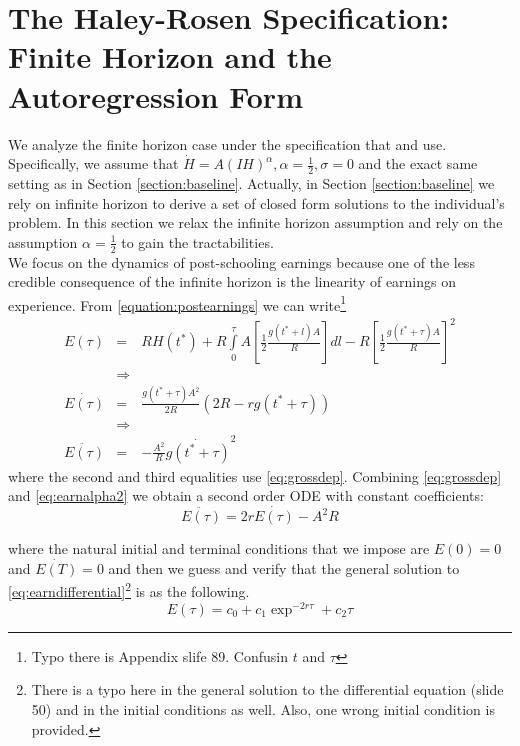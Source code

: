 \section{The Haley-Rosen Specification: Finite Horizon and the Autoregression Form}
We analyze the finite horizon case under the specification that \citet{haley1976estimation} and \citet{rosen1976theory} use. Specifically, we assume that $\dot{H} = A \left( IH \right)^{\alpha}, \alpha = \frac{1}{2}, \sigma = 0$ and the exact same setting as in Section \ref{section:baseline}. Actually, in Section \ref{section:baseline} we rely on infinite horizon to derive a set of closed form solutions to the individual's problem. In this section we relax the infinite horizon assumption and rely on the assumption $\alpha = \frac{1}{2}$ to gain the tractabilities.\\
\indent We focus on the dynamics of post-schooling earnings because one of the less credible consequence of the infinite horizon is the linearity of earnings on experience. From \eqref{equation:postearnings} we can write\footnote{Typo there is Appendix slife 89. Confusin $t$ and $\tau$}
\begin{eqnarray}
E(\tau) &=& RH(t^*) + R \int \limits _{0} ^{\tau} A \left[\frac{1}{2} \frac{g(t^* + l)A}{R} \right]dl - R \left[\frac{1}{2} \frac{g(t^* + \tau)A}{R} \right]^{2} \nonumber \\
&\Rightarrow& \nonumber \\
\dot{E(\tau)} &=& \frac{g (t^* + \tau)A^2}{2R}\left( 2R -rg (t^* + \tau) \right) \nonumber \\
&\Rightarrow& \nonumber \\
\ddot{E(\tau)} &=& -\frac{A^2}{R}\dot{g(t^* + \tau)}^2 \label{eq:earnalpha2}
\end{eqnarray}
where the second and third equalities use \eqref{eq:grossdep}. Combining \eqref{eq:grossdep} and \eqref{eq:earnalpha2} we obtain a second order ODE with constant coefficients:
\begin{equation}
\ddot{E(\tau)} = 2r \dot{E(\tau)} - A^2 R \label{eq:earndifferential}
\end{equation} 

\noindent where the natural initial and terminal conditions that we impose are $E(0)=0$ and $\dot{E(T)} = 0$ and then we guess and verify that the general solution to \eqref{eq:earndifferential}\footnote{There is a typo here in the general solution to the differential equation (slide 50) and in the initial conditions as well. Also, one wrong initial condition is provided.} is as the following.
\begin{equation}
E(\tau) = c_{0} + c_{1}\exp^{-2r \tau} + c_{2} \tau
\end{equation}

